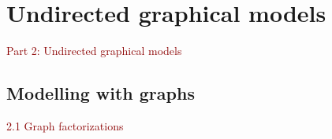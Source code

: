 \documentclass[dvipsnames,aspectratio=169]{beamer} %
\newcommand{\bs}{\boldsymbol}
\begin{document}
%
%





\section{Undirected graphical models}

\begin{frame}{}
\begin{center}
	{\Huge \textcolor{DarkRed}{Part 2: Undirected graphical models}}
\end{center}
\end{frame}


\subsection{Modelling with graphs}
\begin{frame}{}
\begin{center}
	{\huge \textcolor{DarkRed}{2.1 Graph factorizations}}
\end{center}
\end{frame}
\end{document}
